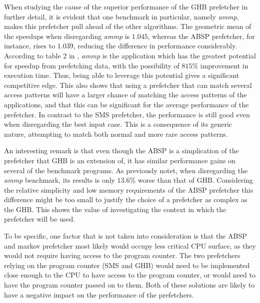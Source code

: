 When studying the cause of the superior performance of the GHB
prefetcher in further detail, it is evident that one benchmark in
particular, namely \emph{ammp}, makes this prefetcher pull ahead of the other
algorithms. The geometric mean of the speedups when disregarding \emph{ammp}
is $1.045$, whereas the ABSP prefetcher, for instance, rises to
$1.039$, reducing the difference in performance
considerably. According to table 2 in \cite{Nesbit}, \emph{ammp} is the
application which has the greatest potential for speedup from
prefetching data, with the possibility of $815\%$ improvement in
execution time. Thus, being able to leverage this potential gives a
significant competitive edge. This also shows that using a prefetcher that can match several access patterns will have a larger chance of matching the access patterns of the applications, and that this can be significant for the average performance of the prefetcher. In contrast to the SMS prefetcher, the performance is still good even when disregarding the best input case. This is a consequence of its generic nature, attempting to match both normal and more rare access patterns.   

An interesting remark is that even though the ABSP is a simplication
of the prefetcher that GHB is an extension of, it has similar
performance gains on several of the benchmark programs. As previously notet, when disregarding the \emph{ammp} benchmark, its results is only $13.6\%$ worse than that of GHB. Considering the relative simplicity and low memory requirements of the ABSP prefetcher this difference might be too small to justify the choice of a prefetcher as complex as the GHB. This shows the value of investigating the context in which the prefetcher will be used.  

To be specific, one factor that is not taken into consideration is that the ABSP and markov prefetcher most likely would occupy less critical CPU surface, as they would not require having access to the program counter. The two prefetchers relying on the program counter (SMS and GHB) would need to be implemented close enough to the CPU to have access to the program counter, or would need to have the program counter passed on to them. Both of these solutions are likely to have a negative impact on the performance of the prefetchers. 
